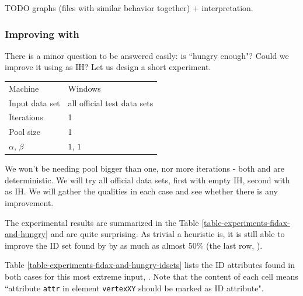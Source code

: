 TODO graphs (files with similar behavior together) + interpretation.

\subsubsection{Improving  with }


There is a minor question to be answered easily: is  ``hungry enough"? Could we improve it using  as IH? Let us design a short experiment.

\begin{center}
\bigskip
\begin{tabular}{| l | l |}
  \hline
  \hline
  Machine           & Windows \\
  Input data set    & all official test data sets \\
  Iterations        & 1 \\
  Pool size         & 1 \\
  $\alpha$, $\beta$ & $1$, $1$ \\
  \hline
\end{tabular}
\bigskip
\end{center}

We won't be needing pool bigger than one, nor more iterations - both  and  are deterministic. We will try all official data sets, first with empty IH, second with  as IH. We will gather the qualities in each case and see whether there is any improvement.

The experimental results are summarized in the Table \ref{table-experiments-fidax-and-hungry} and are quite surprising. As trivial a heuristic  is, it is still able to improve the ID set found by  by as much as almost 50\% (the last row, ).

Table \ref{table-experiments-fidax-and-hungry-idsets} lists the ID attributes found in both cases for this most extreme input, . Note that the content of each cell means ``attribute \texttt{attr} in element \texttt{vertexXY} should be marked as ID attribute".

